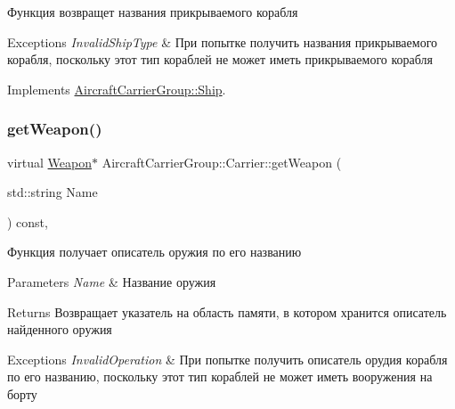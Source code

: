 Функция возвращет названия прикрываемого корабля 


\begin{DoxyExceptions}{Exceptions}
{\em Invalid\+Ship\+Type} & При попытке получить названия прикрываемого корабля, поскольку этот тип кораблей не может иметь прикрываемого корабля \\
\hline
\end{DoxyExceptions}


Implements \mbox{\hyperlink{class_aircraft_carrier_group_1_1_ship_a6455eb63c95dd3598b45b92e42e7f84d}{Aircraft\+Carrier\+Group\+::\+Ship}}.

\mbox{\label{class_aircraft_carrier_group_1_1_carrier_a69e4672d2e5b0e7ff0d27e9ec762b828}} 
\subsubsection{\texorpdfstring{get\+Weapon()}{getWeapon()}}
{\footnotesize\ttfamily virtual \mbox{\hyperlink{class_aircraft_carrier_group_1_1_weapon}{Weapon}}$\ast$ Aircraft\+Carrier\+Group\+::\+Carrier\+::get\+Weapon (\begin{DoxyParamCaption}\item[{std\+::string}]{Name }\end{DoxyParamCaption}) const\hspace{0.3cm}{\ttfamily [inline]}, {\ttfamily [virtual]}}



Функция получает описатель оружия по его названию 


\begin{DoxyParams}{Parameters}
{\em Name} & Название оружия \\
\hline
\end{DoxyParams}
\begin{DoxyReturn}{Returns}
Возвращает указатель на область памяти, в котором хранится описатель найденного оружия 
\end{DoxyReturn}

\begin{DoxyExceptions}{Exceptions}
{\em Invalid\+Operation} & При попытке получить описатель орудия корабля по его названию, поскольку этот тип кораблей не может иметь вооружения на борту \\
\hline
\end{DoxyExceptions}


